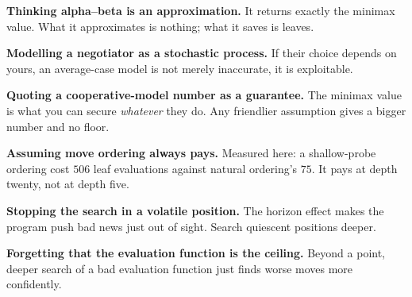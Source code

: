 \begin{pitfall}
\begin{tight}
  \item \textbf{Thinking alpha--beta is an approximation.} It returns exactly the
        minimax value. What it approximates is nothing; what it saves is leaves.
  \item \textbf{Modelling a negotiator as a stochastic process.} If their choice
        depends on yours, an average-case model is not merely inaccurate, it is
        exploitable.
  \item \textbf{Quoting a cooperative-model number as a guarantee.} The minimax
        value is what you can secure \emph{whatever} they do. Any friendlier
        assumption gives a bigger number and no floor.
  \item \textbf{Assuming move ordering always pays.} Measured here: a shallow-probe
        ordering cost $506$ leaf evaluations against natural ordering's $75$. It
        pays at depth twenty, not at depth five.
  \item \textbf{Stopping the search in a volatile position.} The horizon effect
        makes the program push bad news just out of sight. Search quiescent
        positions deeper.
  \item \textbf{Forgetting that the evaluation function is the ceiling.} Beyond a
        point, deeper search of a bad evaluation function just finds worse moves
        more confidently.
\end{tight}
\end{pitfall}

